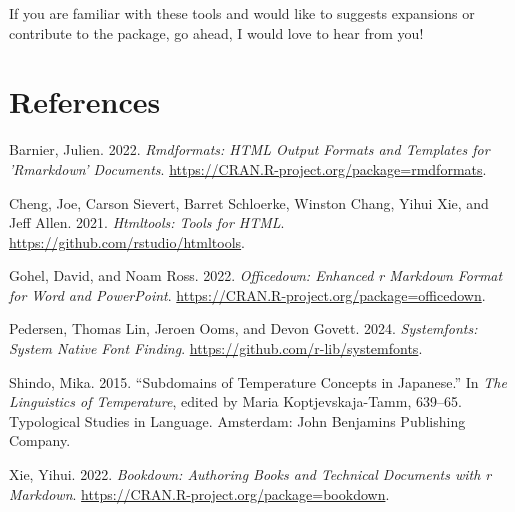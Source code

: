 \documentclass[
  letterpaper,
  DIV=11,
  numbers=noendperiod]{scrartcl}
\newlength{\cslhangindent}
\newenvironment{CSLReferences}[2] %
 {\begin{list}{}{%
  \setlength{\itemindent}{0pt}
  \setlength{\leftmargin}{0pt}
  \setlength{\parsep}{0pt}
  \ifodd #1
   \setlength{\leftmargin}{\cslhangindent}
   \setlength{\itemindent}{-1\cslhangindent}
  \fi
  \setlength{\itemsep}{#2\baselineskip}}}
 {\end{list}}
\begin{document}
If you are familiar with these tools and would like to suggests
expansions or contribute to the package, go ahead, I would love to hear
from you!

\section*{References}\label{references}

\label{refs}
\begin{CSLReferences}{1}{0}
Barnier, Julien. 2022. \emph{Rmdformats: HTML Output Formats and
Templates for 'Rmarkdown' Documents}.
\url{https://CRAN.R-project.org/package=rmdformats}.

Cheng, Joe, Carson Sievert, Barret Schloerke, Winston Chang, Yihui Xie,
and Jeff Allen. 2021. \emph{Htmltools: Tools for HTML}.
\url{https://github.com/rstudio/htmltools}.

Gohel, David, and Noam Ross. 2022. \emph{Officedown: Enhanced r Markdown
Format for Word and PowerPoint}.
\url{https://CRAN.R-project.org/package=officedown}.

Pedersen, Thomas Lin, Jeroen Ooms, and Devon Govett. 2024.
\emph{Systemfonts: System Native Font Finding}.
\url{https://github.com/r-lib/systemfonts}.

Shindo, Mika. 2015. {``Subdomains of Temperature Concepts in
{Japanese}.''} In \emph{The {Linguistics} of {Temperature}}, edited by
Maria Koptjevskaja-Tamm, 639--65. Typological {Studies} in {Language}.
{Amsterdam}: {John Benjamins Publishing Company}.

Xie, Yihui. 2022. \emph{Bookdown: Authoring Books and Technical
Documents with r Markdown}.
\url{https://CRAN.R-project.org/package=bookdown}.

\end{CSLReferences}
\end{document}
